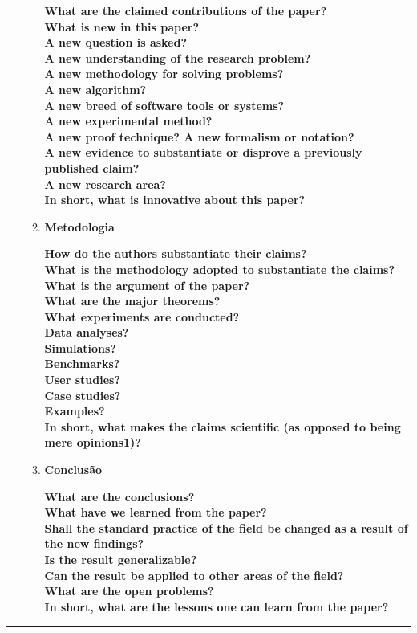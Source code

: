 \begin{enumerate}
\begin{enumerate}[label*=\arabic*.]
    \textbf{What are the claimed contributions of the paper?}\\
    \textbf{What is new in this paper?}\\
    \textbf{A new question is asked?}\\
    \textbf{A new understanding of the research problem?}\\
    \textbf{A new methodology for solving problems?}\\
    \textbf{A new algorithm?}\\
    \textbf{A new breed of software tools or systems?}\\
    \textbf{A new experimental method?}\\
    \textbf{A new proof technique? A new formalism or notation?}\\
    \textbf{A new evidence to substantiate or disprove a previously published claim?}\\
    \textbf{A new research area?}\\
    \textbf{In short, what is innovative about this paper?}
    \\[6pt]

    \item \textbf{Metodologia}
    
    \textbf{How do the authors substantiate their claims?}\\
    \textbf{What is the methodology adopted to substantiate the claims?}\\
    \textbf{What is the argument of the paper?}\\
    \textbf{What are the major theorems?}\\
    \textbf{What experiments are conducted?}\\
    \textbf{Data analyses?}\\
    \textbf{Simulations?\\ Benchmarks?}\\
    \textbf{User studies?}\\
    \textbf{Case studies?}\\
    \textbf{Examples?}\\
    \textbf{In short, what makes the claims scientific (as opposed to being mere opinions1)?}
    \\[6pt]

    \item \textbf{Conclusão}
    
    \textbf{What are the conclusions?}\\
    \textbf{What have we learned from the paper?}\\
    \textbf{Shall the standard practice of the field be changed as a result of the new findings?}\\
    \textbf{Is the result generalizable?}\\
    \textbf{Can the result be applied to other areas of the field?}\\
    \textbf{What are the open problems?}\\
    \textbf{In short, what are the lessons one can learn from the paper?}

\end{enumerate}
\end{enumerate}

\noindent\rule{14.5cm}{0.4pt}